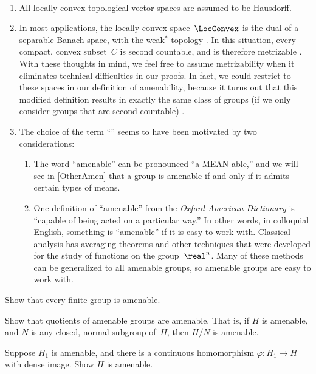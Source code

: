\begin{rems} \ 
\noprelistbreak
	\begin{enumerate}

	\item All locally convex topological vector spaces are assumed to be Hausdorff.

	\item In most applications, the locally convex space~$\LocConvex$ is the dual of a separable Banach space, with the weak$^*$ topology .  In this situation, every compact, convex subset~$C$ is second countable, and is therefore metrizable .
	With these thoughts in mind, we feel free to assume metrizability when it eliminates technical difficulties in our proofs.
In fact, we could restrict to these spaces in our definition of amenability, because it turns out that this modified definition results in exactly the same class of groups (if we only consider groups that are second countable) .

\item The choice of the term ``'' seems to have been motivated by two considerations:%
\noprelistbreak
		\begin{enumerate}
		\item The word ``amenable'' can be pronounced ``a-MEAN-able\zz,'' and we will see in \cref{OtherAmen} that a group is amenable if and only if it admits certain types of means.
		\item One definition of ``amenable'' from the \emph{Oxford American Dictionary} is ``capable of being acted on a particular way\zz.'' In other words, in colloquial English, something is ``amenable'' if it is easy to work with. Classical analysis has averaging theorems and other techniques that were developed for the study of functions on the group~$\real^n$. Many of these methods can be generalized to all amenable groups, so amenable groups are easy to work with.
		\end{enumerate}
	\end{enumerate}
\end{rems}

\begin{exercises}

\item Show that every finite group is amenable.

\item \label{QuotAmen}
Show that quotients of amenable groups are amenable. That is, if $H$ is amenable, and $N$ is any closed, normal subgroup of~$H$, then $H/N$ is amenable.

\item Suppose $H_1$ is amenable, and there is a continuous homomorphism $\varphi \colon H_1 \to H$ with dense image. Show $H$ is amenable.

\end{exercises}






